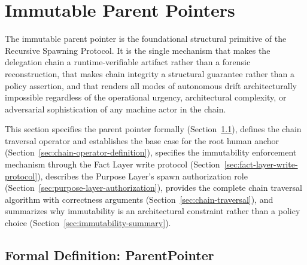 \section{Immutable Parent Pointers}
\label{sec:immutable-parent-pointers}

The immutable parent pointer is the foundational structural primitive of the Recursive Spawning Protocol. It is the single mechanism that makes the delegation chain a runtime-verifiable artifact rather than a forensic reconstruction, that makes chain integrity a structural guarantee rather than a policy assertion, and that renders all modes of autonomous drift architecturally impossible regardless of the operational urgency, architectural complexity, or adversarial sophistication of any machine actor in the chain.

This section specifies the parent pointer formally (Section~\ref{sec:parent-pointer-formal}), defines the chain traversal operator and establishes the base case for the root human anchor (Section~\ref{sec:chain-operator-definition}), specifies the immutability enforcement mechanism through the Fact Layer write protocol (Section~\ref{sec:fact-layer-write-protocol}), describes the Purpose Layer's spawn authorization role (Section~\ref{sec:purpose-layer-authorization}), provides the complete chain traversal algorithm with correctness arguments (Section~\ref{sec:chain-traversal}), and summarizes why immutability is an architectural constraint rather than a policy choice (Section~\ref{sec:immutability-summary}).

\subsection{Formal Definition: ParentPointer}
\label{sec:parent-pointer-formal}

